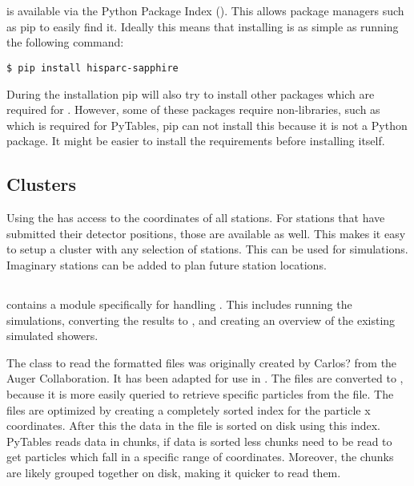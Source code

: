 \section{\sapphire}

\subsection{\pypi}

\sapphire is available via the Python Package Index (\pypi). This allows
package managers such as pip to easily find it. Ideally this means that installing \sapphire is as simple as running the following command:

\begin{verbatim}
$ pip install hisparc-sapphire
\end{verbatim}

During the installation pip will also try to install other packages which are required for \sapphire. However, some of these packages require non-\python libraries, such as \hdf which is required for PyTables, pip can not install this because it is not a Python package. It might be easier to install the requirements before installing \sapphire itself.


\subsection{Clusters}

Using the \api \sapphire has access to the \gps coordinates of all
stations. For stations that have submitted their detector positions,
those are available as well. This makes it easy to setup a cluster with
any selection of \hisparc stations. This can be used for simulations.
Imaginary stations can be added to plan future station locations.


\subsection{\corsika}

\sapphire contains a module specifically for handling \corsika. This includes running the \corsika simulations, converting the results to \hdf, and creating an overview of the existing \corsika simulated showers.

The class to read the \corsika \fortran formatted files was originally created by Carlos? from the Auger Collaboration. It has been adapted for use in \hisparc. The files are converted to \hdf, because it is more easily queried to retrieve specific particles from the file. The \hdf files are optimized by creating a completely sorted index for the particle x coordinates. After this the data in the file is sorted on disk using this index. PyTables reads data in chunks, if data is sorted less chunks need to be read to get particles which fall in a specific range of coordinates. Moreover, the chunks are likely grouped together on disk, making it quicker to read them.


